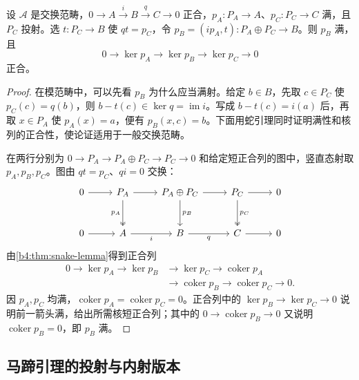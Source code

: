 \begin{lemma}\label{b4:lem:horseshoe-step}
	设 \(\mathcal A\) 是交换范畴，\(0\to A\xrightarrow{i}B\xrightarrow{q}C\to0\) 正合，\(p_A:P_A\to A\)、\(p_C:P_C\to C\) 满，且 \(P_C\) 投射。选 \(t:P_C\to B\) 使 \(qt=p_C\)，令 \(p_B=(ip_A,t):P_A\oplus P_C\to B\)。则 \(p_B\) 满，且
	\[
		0\longrightarrow\ker p_A\longrightarrow\ker p_B \longrightarrow\ker p_C\longrightarrow0
	\]
	正合。
\end{lemma}
\begin{proof}
	在模范畴中，可以先看 \(p_B\) 为什么应当满射。给定 \(b\in B\)，先取 \(c\in P_C\) 使 \(p_C(c)=q(b)\)，则 \(b-t(c)\in\ker q=\operatorname{im}i\)。写成 \(b-t(c)=i(a)\) 后，再取 \(x\in P_A\) 使 \(p_A(x)=a\)，便有 \(p_B(x,c)=b\)。下面用蛇引理同时证明满性和核列的正合性，使论证适用于一般交换范畴。

	在两行分别为 \(0\to P_A\to P_A\oplus P_C\to P_C\to0\) 和给定短正合列的图中，竖直态射取 \(p_A,p_B,p_C\)。图由 \(qt=p_C\)、\(qi=0\) 交换：
	\[
		\begin{tikzcd}[column sep=2.5em,row sep=large]
			0\arrow[r]&P_A\arrow[r]\arrow[d,two heads,"p_A"']&P_A\oplus P_C\arrow[r]\arrow[d,"p_B"]&P_C\arrow[r]\arrow[d,two heads,"p_C"]&0\\
			0\arrow[r]&A\arrow[r,"i"']&B\arrow[r,"q"']&C\arrow[r]&0
		\end{tikzcd}
	\]
	由\cref{b4:thm:snake-lemma}得到正合列
	\[
		\begin{aligned}
			0\longrightarrow\ker p_A\longrightarrow\ker p_B &\longrightarrow\ker p_C\longrightarrow\operatorname{coker}p_A\\
			&\longrightarrow\operatorname{coker}p_B \longrightarrow\operatorname{coker}p_C\longrightarrow0.
		\end{aligned}
	\]
	因 \(p_A,p_C\) 均满，\(\operatorname{coker}p_A=\operatorname{coker}p_C=0\)。正合列中的 \(\ker p_B\to\ker p_C\to0\) 说明前一箭头满，给出所需核短正合列；其中的 \(0\to\operatorname{coker}p_B\to0\) 又说明 \(\operatorname{coker}p_B=0\)，即 \(p_B\) 满。
\end{proof}

\subsection{马蹄引理的投射与内射版本}
\label{b4:subsec:0703:02}

